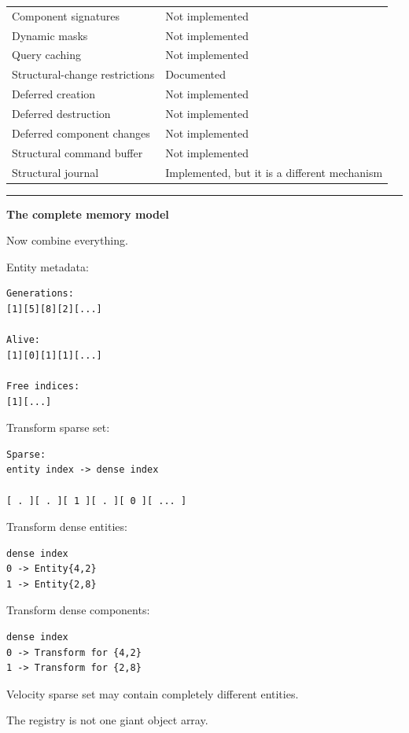 {\begin{longtable}[]{@{}ll@{}}
Component signatures & Not implemented \\
Dynamic masks & Not implemented \\
Query caching & Not implemented \\
Structural-change restrictions & Documented \\
Deferred creation & Not implemented \\
Deferred destruction & Not implemented \\
Deferred component changes & Not implemented \\
Structural command buffer & Not implemented \\
Structural journal & Implemented, but it is a different mechanism \\
\end{longtable}
}

\begin{center}\rule{0.5\linewidth}{0.5pt}\end{center}

\textbf{The complete memory model}

Now combine everything.

Entity metadata:

\begin{verbatim}
Generations:
[1][5][8][2][...]

Alive:
[1][0][1][1][...]

Free indices:
[1][...]
\end{verbatim}

Transform sparse set:

\begin{verbatim}
Sparse:
entity index -> dense index

[ . ][ . ][ 1 ][ . ][ 0 ][ ... ]
\end{verbatim}

Transform dense entities:

\begin{verbatim}
dense index
0 -> Entity{4,2}
1 -> Entity{2,8}
\end{verbatim}

Transform dense components:

\begin{verbatim}
dense index
0 -> Transform for {4,2}
1 -> Transform for {2,8}
\end{verbatim}

Velocity sparse set may contain completely different entities.

The registry is not one giant object array.

